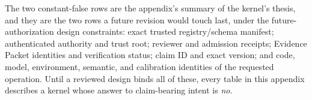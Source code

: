 The two constant-false rows are the appendix's summary of the kernel's thesis, and they are the two rows a future revision would touch last, under the future-authorization design constraints: exact trusted registry/schema manifest; authenticated authority and trust root; reviewer and admission receipts; Evidence Packet identities and verification status; claim ID and exact version; and code, model, environment, semantic, and calibration identities of the requested operation. Until a reviewed design binds all of these, every table in this appendix describes a kernel whose answer to claim-bearing intent is \emph{no}.

